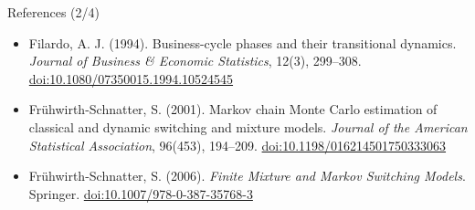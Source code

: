 \begin{frame}{References (2/4)}
\begin{itemize}
    \item Filardo, A. J. (1994). Business-cycle phases and their transitional dynamics. \textit{Journal of Business \& Economic Statistics}, 12(3), 299--308. \href{https://doi.org/10.1080/07350015.1994.10524545}{doi:10.1080/07350015.1994.10524545}
    \item Frühwirth-Schnatter, S. (2001). Markov chain Monte Carlo estimation of classical and dynamic switching and mixture models. \textit{Journal of the American Statistical Association}, 96(453), 194--209. \href{https://doi.org/10.1198/016214501750333063}{doi:10.1198/016214501750333063}
    \item Frühwirth-Schnatter, S. (2006). \textit{Finite Mixture and Markov Switching Models}. Springer. \href{https://doi.org/10.1007/978-0-387-35768-3}{doi:10.1007/978-0-387-35768-3}
\end{itemize}
\end{frame}

